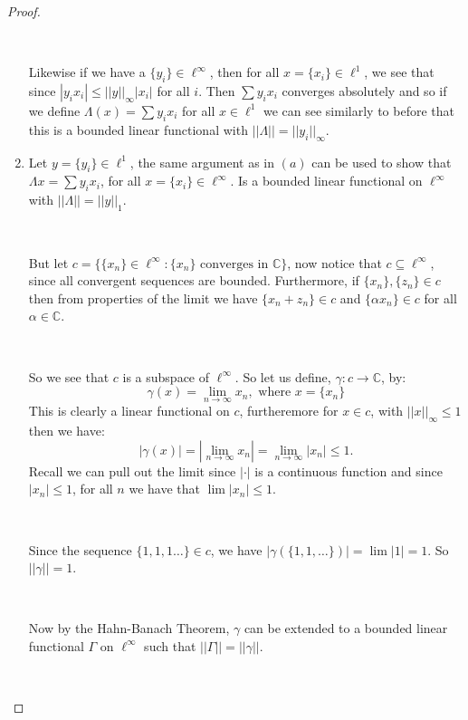 \documentclass{article}
\newcommand{\C}{\mathbb{C}}
\theoremstyle{definition}
\theoremstyle{remark}
\theoremstyle{definition}
\begin{document}
\begin{proof}
\begin{enumerate}[label = (\alph*)]
\

Likewise if we have a $\{y_i\}\in \ell^\infty$, then for all $x = \{x_i\}\in \ell^1$, we see that since $|{y_i}{x_i}|\leq ||y||_\infty |x_i|$ for all $i$. Then
$\sum y_i x_i$ converges absolutely and so if we define $\Lambda(x) = \sum y_i x_i$ for all $x\in \ell^1$ we can see similarly to before that this is a bounded 
linear functional with $||\Lambda|| = ||y_i||_\infty$.

\item Let $y = \{y_i\}\in \ell^1$, the same argument as in $(a)$ can be used to show that $\Lambda x = \sum {y_i}{x_i}$, for all $x = \{x_i\}\in \ell^\infty$.
Is a bounded linear functional on $\ell^\infty$ with $||\Lambda|| = ||y||_1$. 

\

But let $c = \{\{x_n\}\in \ell^\infty \colon \{x_n\}\text{ converges in }\C \}$, now notice that $c\subseteq \ell^\infty$, since all convergent sequences are bounded.
Furthermore, if $\{x_n\}, \{z_n\}\in c$ then from properties of the limit we have $\{x_n+z_n\}\in c$ and $\{\alpha x_n\}\in c$ for all $\alpha\in\C$.

\

So we see that $c$ is a subspace of $\ell^\infty$. So let us define, $\gamma\colon c\rightarrow \C$, by:\begin{equation}
    \gamma(x) = \lim_{n\rightarrow\infty} x_n, \text{ where }x=\{x_n\}
\end{equation}
This is clearly a linear functional on $c$, furtheremore for $x\in c$, with $||x||_\infty \leq 1$ then we have:\begin{equation}
    |\gamma(x)| = |\lim_{n\rightarrow \infty} x_n| = \lim_{n\rightarrow \infty}|x_n|\leq 1.
\end{equation}
Recall we can pull out the limit since $|\cdot|$ is a continuous function and since $|x_n|\leq 1$, for all $n$ we have that $\lim |x_n|\leq 1$.

\

Since the sequence $\{1,1,1\dots\}\in c$, we have $|\gamma(\{1,1,\dots\})| = \lim |1| = 1$. So $||\gamma|| = 1$.

\

Now by the Hahn-Banach Theorem, $\gamma$ can be extended to a bounded linear functional $\Gamma$ on $\ell^\infty$ such that $||\Gamma|| = ||\gamma||$.

\


\end{enumerate}
\end{proof}
\end{document}
